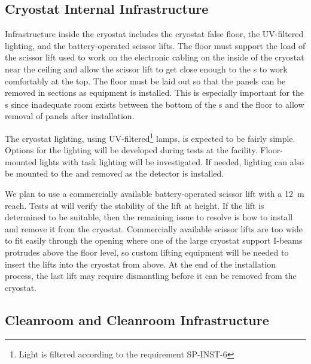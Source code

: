 \subsection{Cryostat Internal Infrastructure}
\label{sec:fdsp-tc-infr-cryo-int}



Infrastructure inside the cryostat includes the cryostat false floor, the UV-filtered lighting, and the battery-operated scissor lifts. 
The floor must support the load of the scissor lift used to work on the electronic cabling on the inside of the cryostat near the ceiling and allow the scissor lift to get close enough to the s to work comfortably at the top. 
The floor  must be laid out so that the panels can be removed in sections as equipment is installed. 
This is especially important for the s since inadequate room exists between the bottom of the s and the floor to allow removal of panels after installation. 

The cryostat lighting, using UV-filtered\footnote{Light is filtered according to the requirement SP-INST-6}  lamps, is expected to be fairly simple. Options for the lighting will be developed during tests at the  facility.
Floor-mounted lights with task lighting will be investigated. If needed, lighting can also be mounted to the  and removed as the detector is installed.

We plan to use a commercially available battery-operated scissor lift with a \SI{12}{m} reach. Tests at  will verify the stability of the lift at height. If the lift is determined to be suitable, then the remaining issue to resolve is how to install and remove it from the cryostat. 
Commercially available scissor lifts are too wide to fit easily through the  opening where one of the large cryostat support I-beams protrudes above the  floor level,  so 
custom lifting equipment will be needed to insert the lifts into the cryostat from above. 
At the end of the installation process, the last lift may require dismantling before it can be removed from the cryostat.


\subsection{Cleanroom and Cleanroom Infrastructure}
\label{sec:fdsp-tc-infr-comm}

